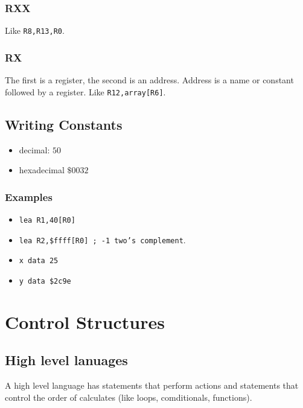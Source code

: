 \subsubsection{RXX}\label{ssub:rxx}

Like \texttt{R8,R13,R0}.

\subsubsection{RX}\label{ssub:rx}

The first is a register, the second is an address.
Address is a name or constant followed by a register.
Like \texttt{R12,array[R6]}.

\subsection{Writing Constants}\label{sub:writing_constants}

\begin{itemize}
	\item decimal: \(50\)
	\item hexadecimal \(\$0032\)
\end{itemize}

\subsubsection{Examples}\label{ssub:examples}

\begin{itemize}
	\item \texttt{lea R1,40[R0]}
	\item \texttt{lea R2,\$ffff[R0] ; -1 two's complement}.
	\item \texttt{x data 25}
	\item \texttt{y data \$2c9e}
\end{itemize}

\section{Control Structures}\label{sec:control_structures}

\subsection{High level lanuages}\label{sub:high_level_lanuages}

A high level language has statements that perform actions and statements that control the order of calculates (like loops, comditionals, functions).

